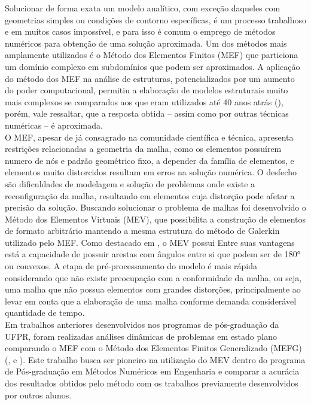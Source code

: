\indent Solucionar de forma exata um modelo analítico, com exceção daqueles com geometrias simples ou condições de contorno específicas, é um processo trabalhoso e em muitos casos impossível, e para isso é comum o emprego de métodos numéricos para obtenção de uma solução aproximada. Um dos métodos mais amplamente utilizados é o Método dos Elementos Finitos (MEF) que particiona um domínio complexo em subdomínios que podem ser aproximados. A aplicação do método dos MEF na análise de estruturas, potencializados por um aumento do poder computacional, permitiu a elaboração de modelos estruturais muito mais complexos se comparados aos que eram utilizados até 40 anos atrás (\citet{mechanicalvibrations2017}), porém, vale ressaltar, que a resposta obtida -- assim como por outras técnicas numéricas -- é aproximada. \\
\indent O MEF, apesar de já consagrado na comunidade científica e técnica, apresenta restrições relacionadas a geometria da malha, como os elementos possuírem numero de nós e padrão geométrico fixo, a depender da família de elementos, e elementos muito distorcidos resultam em erros na solução numérica. O desfecho são dificuldades de modelagem e solução de problemas onde existe a reconfiguração da malha, resultando em elementos cuja distorção pode afetar a precisão da solução. Buscando solucionar o problema de malhas foi desenvolvido o Método dos Elementos Virtuais (MEV), que possibilita a construção de elementos de formato arbitrário mantendo a mesma estrutura do método de Galerkin utilizado pelo MEF. Como destacado em \citet{engineeringperspectivevirtualelementmethoditsinterplaystandardfiniteelementmethod2019a}, o MEV possui Entre suas vantagens está a capacidade de possuir arestas com ângulos entre si que podem ser de 180° ou convexos.  A etapa de pré-processamento do modelo é mais rápida considerando que não existe preocupação com a conformidade da malha, ou seja, uma malha que não possua elementos com grandes distorções, principalmente ao levar em conta que a elaboração de uma malha conforme demanda considerável quantidade de tempo.\\
\indent Em trabalhos anteriores desenvolvidos nos programas de pós-graduação da UFPR, foram realizadas análises dinâmicas de problemas em estado plano comparando o MEF com o Método dos Elementos Finitos Generalizado (MEFG) (\citet{torii2012analise},\citet{cittadin2020enriquecimento} e \citet{custodio2022metodo}). Este trabalho busca ser pioneiro na utilização do MEV dentro do programa de Pós-graduação em Métodos Numéricos em Engenharia e comparar a acurácia dos resultados obtidos pelo método com os trabalhos previamente desenvolvidos por outros alunos.

